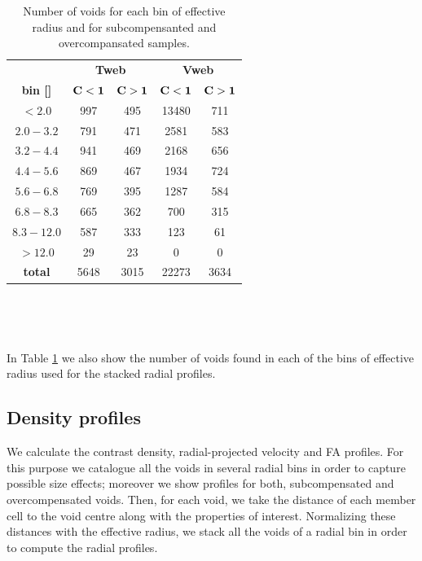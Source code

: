 \documentclass[a4,useAMS,usenatbib,usegraphicx]{mn2e}
\newcommand{\hMpc}{{\ifmmode{h^{-1}{\rm Mpc}}\else{$h^{-1}$Mpc}\fi}}
\begin{document}
\begin{table}[!htbp]
\centering
\begin{tabular}{c | c c | c c}
\toprule
\multicolumn{1}{c}{}&  \multicolumn{2}{c}{\textbf{Tweb}} & \multicolumn{2}{c}{\textbf{Vweb}}\\
\textbf{bin [\hMpc]}   & $\bf{C<1}$   & $\bf{C>1}$    & $\bf{C<1}$   & $\bf{C>1}$\\ \hline
$<2.0$        &  997 & 495   & 13480  & 711\\
$2.0-3.2$     &  791 & 471   & 2581   & 583\\
$3.2-4.4$     &  941 & 469   & 2168   & 656\\
$4.4-5.6$     &  869 & 467   & 1934   & 724\\
$5.6-6.8$     &  769 & 395   & 1287   & 584\\
$6.8-8.3$     &  665 & 362   & 700    & 315\\
$8.3-12.0$    &  587 & 333   & 123    & 61\\
$>12.0$       &  29  & 23    & 0      & 0\\ \hline
\textbf{total}& 5648 & 3015  & 22273  & 3634\\
\bottomrule
\end{tabular}
\caption{Number of voids for each bin of effective radius and for 
subcompensanted and overcompansated samples.}
\label{tab:number_voids}
\end{table}

\

\

In Table \ref{tab:number_voids} we also show the number of voids found in 
each of the bins of effective radius used for the stacked radial profiles.


\subsection{Density profiles}
\label{subsec:density_voids}


We calculate the contrast density, radial-projected velocity and 
FA profiles. For this purpose we catalogue all the voids in several radial 
bins in order to capture possible size effects; moreover we show profiles 
for both, subcompensated and overcompensated voids. Then, for each void, 
we take the distance of each member cell to the void centre along with the 
properties of interest. Normalizing these distances with the effective 
radius, we stack all the voids of a radial bin in order to compute the 
radial profiles.
\end{document}
